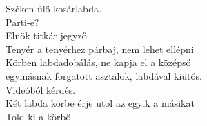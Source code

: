 \documentclass[a4paper, 12pt, twoside, openright]{article}
\begin{document}
Széken ülő kosárlabda.\\
Parti-e?\\
Elnök titkár jegyző\\
Tenyér a tenyérhez párbaj, nem lehet ellépni\\
Körben labdadobálás, ne kapja el a középső\\
egymásnak forgatott asztalok, labdával kiütős.\\
Videóból kérdés.\\
Két labda körbe érje utol az egyik a másikat\\
Told ki a körből\\
\end{document}
